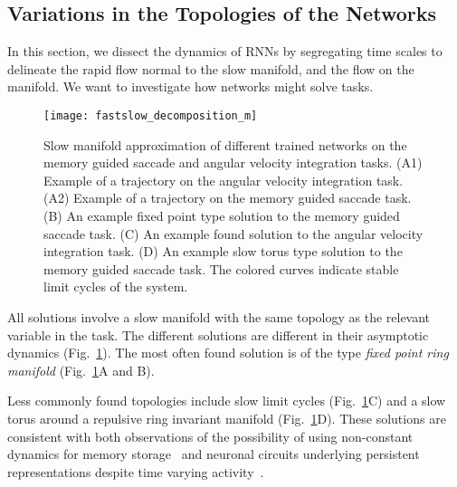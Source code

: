 \documentclass{article} %
\newcounter{ct}
\theoremstyle{definition}
\theoremstyle{remark}
\begin{document}
\subsection{Variations in the Topologies of the Networks}\label{sec:topologies}
In this section, we dissect the dynamics of RNNs by segregating time scales to delineate the rapid flow normal to the slow manifold, and the flow on the manifold.
We want to investigate how networks might solve tasks.

\begin{figure}[tbhp]
  \centering
  \texttt{[image: fastslow\_decomposition\_m]}
  \caption{Slow manifold approximation of different trained networks on the memory guided saccade and angular velocity integration tasks.
 (A1) Example of a trajectory on the  angular velocity integration task.
 (A2) Example of a trajectory on the  memory guided saccade task.
 (B) An example fixed point type solution to the memory guided saccade task.
 (C) An example found solution to the angular velocity integration task.
 (D) An example slow torus type solution to the memory guided saccade task. The colored curves indicate stable limit cycles of the system.
}
  \label{fig:fastslow_decomposition}
\end{figure}

All solutions involve a slow manifold with the same topology as the relevant variable in the task.
The different solutions are different in their asymptotic dynamics (Fig.~\ref{fig:fastslow_decomposition}).
The most often found solution is of the type \emph{fixed point ring manifold} (Fig.~\ref{fig:fastslow_decomposition}A and B).

Less commonly found topologies include slow limit cycles (Fig.~\ref{fig:fastslow_decomposition}C) and a slow torus around a repulsive ring invariant manifold (Fig.~\ref{fig:fastslow_decomposition}D).
These solutions are consistent with both observations of the possibility of using non-constant dynamics for memory storage~\citep{hirsch1995computing,Park2023a} and neuronal circuits underlying persistent representations despite time varying activity~\citep{druckmann2012neuronal}.
\end{document}
